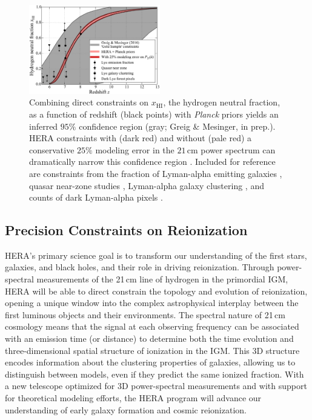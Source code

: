 \documentclass[preprint,11pt]{aastex}
\begin{document}
\begin{figure}[h!]
\centering
    \includegraphics[width=0.51\textwidth,clip]{plots/ionHist.pdf}
  \caption{Combining direct constraints on $x_\text{HI}$, the hydrogen neutral fraction, as a function of redshift (black points) with \emph{Planck} priors \citep{planck_et_al2015} yields
an inferred $95\%$ confidence region (gray; Greig \& Mesinger, in prep.).  HERA constraints with (dark red) and without (pale red) 
a conservative $25\%$ modeling error in the $21\,\textrm{cm}$ power spectrum can dramatically narrow this confidence region \citep{liu_parsons2015}. Included for reference are constraints from the fraction of Lyman-alpha emitting galaxies \citep{pentericci_et_al2014,schenker_et_al2014}, quasar near-zone studies \citep{mortlock_et_al2011,bolton_et_al2011,schroeder_et_al2013}, Lyman-alpha galaxy clustering \citep{mcquinn_et_al2007_lya_clustering,ouchi_et_al2010}, and counts of dark Lyman-alpha pixels \citep{mcgreer_et_al2015}.}
	\label{fig:IonHist}
\end{figure} 


\subsection{Precision Constraints on Reionization}
\label{sec:EoRPowerSpectra}

HERA's primary science goal is to transform our understanding of the first stars, galaxies, 
and black holes, and their role in driving reionization. 
Through power-spectral measurements of the 21\,cm line of hydrogen in the primordial IGM,
HERA will be able to direct constrain the topology and evolution of reionization, 
opening a unique window into the complex astrophysical interplay between the 
first luminous objects and their environments.
The spectral nature of 21\,cm cosmology means that 
the signal at each observing frequency can be associated with an emission time (or distance) to determine both the time evolution
and three-dimensional spatial structure of ionization in the IGM.
This 3D structure encodes information about the clustering properties of galaxies,
allowing us to distinguish between models, even if they predict the same ionized fraction. 
With a new telescope optimized for 3D power-spectral measurements and with support for theoretical
modeling efforts, the HERA program will advance our understanding of early galaxy formation and cosmic reionization.
\end{document}

